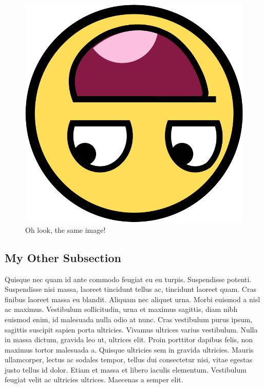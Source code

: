             \begin{figure}
                \centerline{\includegraphics[scale=0.25]{face.png}}
                \caption{Oh look, the same image!}
                \label{fig:example_img_2}
            \end{figure}

    \subsection{My Other Subsection}
    \label{sub:my_other_subsection}
        Quisque nec quam id ante commodo feugiat eu eu turpis. Suspendisse potenti. Suspendisse nisi massa, laoreet tincidunt tellus ac, tincidunt laoreet quam. Cras finibus laoreet massa eu blandit. Aliquam nec aliquet urna. Morbi euismod a nisl ac maximus. Vestibulum sollicitudin, urna et maximus sagittis, diam nibh euismod enim, id malesuada nulla odio at nunc. Cras vestibulum purus ipsum, sagittis suscipit sapien porta ultricies. Vivamus ultrices varius vestibulum. Nulla in massa dictum, gravida leo ut, ultrices elit. Proin porttitor dapibus felis, non maximus tortor malesuada a. Quisque ultricies sem in gravida ultricies. Mauris ullamcorper, lectus ac sodales tempor, tellus dui consectetur nisi, vitae egestas justo tellus id dolor. Etiam et massa et libero iaculis elementum. Vestibulum feugiat velit ac ultricies ultrices. Maecenas a semper elit.

